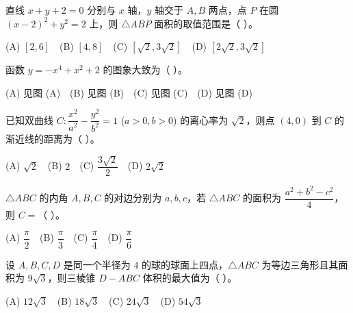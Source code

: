 \begin{question}
直线 $x + y + 2 = 0$ 分别与 $x$ 轴，$y$ 轴交于 $A, B$ 两点，点 $P$ 在圆 $(x - 2)^2 + y^2 = 2$ 上，则 $\triangle ABP$ 面积的取值范围是（ ）。

(A) $[2, 6]$　(B) $[4, 8]$　(C) $[\sqrt2, 3\sqrt2]$　(D) $[2\sqrt2, 3\sqrt2]$

\Needspace{0.4\textheight}
\end{question}
\begin{question}
函数 $y = -x^4 + x^2 + 2$ 的图象大致为（ ）。
\nopagebreak[4]
\begin{center}\end{center}
\nopagebreak[4]
(A) 见图 (A)　(B) 见图 (B)　(C) 见图 (C)　(D) 见图 (D)

\end{question}
\begin{question}
已知双曲线 $C: \dfrac{x^2}{a^2} - \dfrac{y^2}{b^2} = 1$ ($a > 0, b > 0$) 的离心率为 $\sqrt2$，则点 $(4, 0)$ 到 $C$ 的渐近线的距离为（ ）。

(A) $\sqrt2$　(B) $2$　(C) $\dfrac{3\sqrt2}{2}$　(D) $2\sqrt2$

\end{question}
\begin{question}
$\triangle ABC$ 的内角 $A, B, C$ 的对边分别为 $a, b, c$，若 $\triangle ABC$ 的面积为 $\dfrac{a^2 + b^2 - c^2}{4}$，则 $C =$（ ）。

(A) $\dfrac\pi2$　(B) $\dfrac\pi3$　(C) $\dfrac\pi4$　(D) $\dfrac\pi6$

\end{question}
\begin{question}
设 $A, B, C, D$ 是同一个半径为 $4$ 的球的球面上四点，$\triangle ABC$ 为等边三角形且其面积为 $9\sqrt3$，则三棱锥 $D - ABC$ 体积的最大值为（ ）。

(A) $12\sqrt3$　(B) $18\sqrt3$　(C) $24\sqrt3$　(D) $54\sqrt3$

\par\medskip

\end{question}

